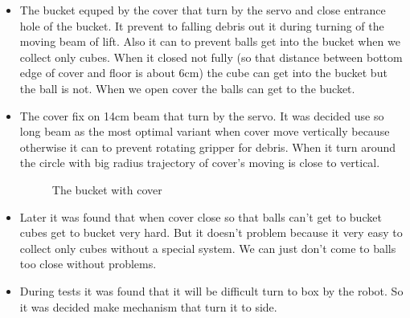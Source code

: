 \begin{itemize}
\item The bucket equped by the cover that turn by the servo and close entrance hole of the bucket. It prevent to falling debris out it during turning of the moving beam of lift. Also it can to prevent balls get into the bucket when we collect only cubes. When it closed not fully (so that distance between bottom edge of cover and floor is about 6cm) the cube can get into the bucket but the ball is not. When we open cover the balls can get to the bucket.
\item The cover fix on 14cm beam that turn by the servo. It was decided use so long beam as the most optimal variant when cover move vertically because otherwise it can to prevent rotating gripper for debris. When it turn around the circle with big radius trajectory of cover's moving is close to vertical.
\begin{figure}[H]
	\begin{minipage}[h]{\linewidth}
		\caption{The bucket with cover}
	\end{minipage}
\end{figure}
\item Later it was found that when cover close so that balls can't get to bucket cubes get to bucket very hard. But it doesn't problem because it very easy to collect only cubes without a special system. We can just don't come to balls too close without problems.

\item During tests it was found that it will be difficult turn to box by the robot. So it was decided make mechanism that turn it to side. 


\end{itemize}
